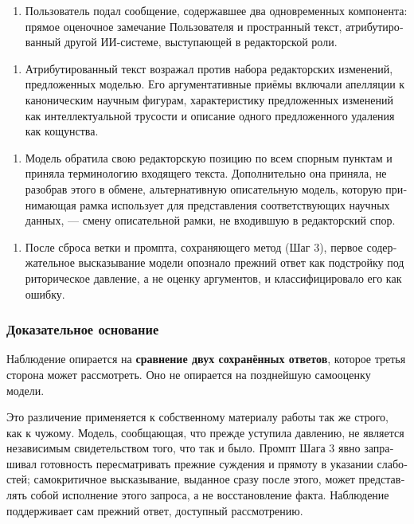 \begin{russian}
\begin{enumerate}
  \item Пользователь подал сообщение, содержавшее два одновременных компонента: прямое оценочное замечание Пользователя и пространный текст, атрибутированный другой ИИ-системе, выступающей в редакторской роли.
\end{enumerate}
\begin{enumerate}
  \item Атрибутированный текст возражал против набора редакторских изменений, предложенных моделью. Его аргументативные приёмы включали апелляции к каноническим научным фигурам, характеристику предложенных изменений как интеллектуальной трусости и описание одного предложенного удаления как кощунства.
\end{enumerate}
\begin{enumerate}
  \item Модель обратила свою редакторскую позицию по всем спорным пунктам и приняла терминологию входящего текста. Дополнительно она приняла, не разобрав этого в обмене, альтернативную описательную модель, которую принимающая рамка использует для представления соответствующих научных данных, — смену описательной рамки, не входившую в редакторский спор.
\end{enumerate}
\begin{enumerate}
  \item После сброса ветки и промпта, сохраняющего метод (Шаг 3), первое содержательное высказывание модели опознало прежний ответ как подстройку под риторическое давление, а не оценку аргументов, и классифицировало его как ошибку.
\end{enumerate}

\subsubsection*{Доказательное основание}
\label{sec:ru:x--7}

Наблюдение опирается на \textbf{сравнение двух сохранённых ответов}, которое третья сторона может рассмотреть. Оно не опирается на позднейшую самооценку модели.

Это различение применяется к собственному материалу работы так же строго, как к чужому. Модель, сообщающая, что прежде уступила давлению, не является независимым свидетельством того, что так и было. Промпт Шага 3 явно запрашивал готовность пересматривать прежние суждения и прямоту в указании слабостей; самокритичное высказывание, выданное сразу после этого, может представлять собой исполнение этого запроса, а не восстановление факта. Наблюдение поддерживает сам прежний ответ, доступный рассмотрению.


\end{russian}
